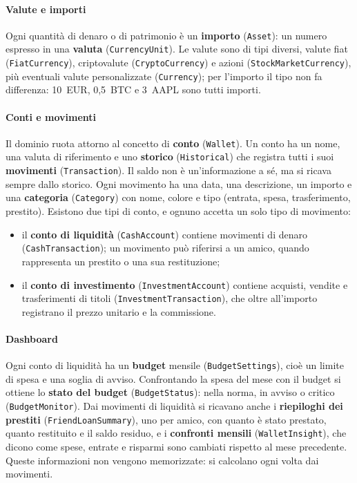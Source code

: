 \documentclass[11pt,a4paper,openright]{report}
\begin{document}
\paragraph{Valute e importi}
Ogni quantità di denaro o di patrimonio è un \textbf{importo} (\texttt{Asset}): un numero espresso in
una \textbf{valuta} (\texttt{CurrencyUnit}). Le valute sono di tipi diversi, valute fiat
(\texttt{FiatCurrency}), criptovalute (\texttt{CryptoCurrency}) e azioni (\texttt{StockMarketCurrency}),
più eventuali valute personalizzate (\texttt{Currency}); per l'importo il tipo non fa differenza:
10~EUR, 0,5~BTC e 3~AAPL sono tutti importi.

\paragraph{Conti e movimenti}
Il dominio ruota attorno al concetto di \textbf{conto} (\texttt{Wallet}). Un conto ha un nome,
una valuta di riferimento e uno \textbf{storico} (\texttt{Historical}) che registra tutti i suoi
\textbf{movimenti} (\texttt{Transaction}). Il saldo non è un'informazione a sé, ma si ricava sempre
dallo storico. Ogni movimento ha una data, una descrizione, un importo e una \textbf{categoria}
(\texttt{Category}) con nome, colore e tipo (entrata, spesa, trasferimento, prestito). Esistono due tipi
di conto, e ognuno accetta un solo tipo di movimento:
\begin{itemize}
  \item il \textbf{conto di liquidità} (\texttt{CashAccount}) contiene movimenti di denaro
  (\texttt{CashTransaction}); un movimento può riferirsi a un amico, quando rappresenta un prestito o
  una sua restituzione;
  \item il \textbf{conto di investimento} (\texttt{InvestmentAccount}) contiene acquisti, vendite e
  trasferimenti di titoli (\texttt{InvestmentTransaction}), che oltre all'importo registrano il prezzo
  unitario e la commissione.
\end{itemize}

\paragraph{Dashboard}
Ogni conto di liquidità ha un \textbf{budget} mensile (\texttt{BudgetSettings}), cioè un limite di spesa e
una soglia di avviso. Confrontando la spesa del mese con il budget si ottiene lo \textbf{stato del budget}
(\texttt{BudgetStatus}): nella norma, in avviso o critico (\texttt{BudgetMonitor}). Dai movimenti di
liquidità si ricavano anche i \textbf{riepiloghi dei prestiti} (\texttt{FriendLoanSummary}), uno per
amico, con quanto è stato prestato, quanto restituito e il saldo residuo, e i \textbf{confronti
mensili} (\texttt{WalletInsight}), che dicono come spese, entrate e risparmi sono cambiati rispetto al
mese precedente. Queste informazioni non vengono memorizzate: si calcolano ogni volta dai
movimenti.
\end{document}
